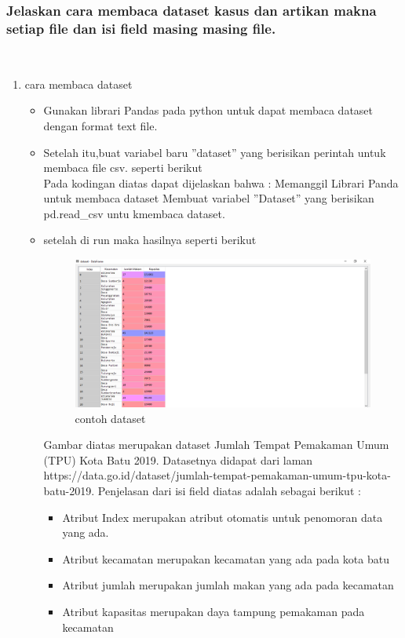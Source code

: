 \subsubsection{Jelaskan cara membaca dataset kasus dan artikan makna setiap ﬁle dan isi ﬁeld masing masing ﬁle.}
\hfill\\
\begin{enumerate}
\item cara membaca dataset
\hfill\\
	\begin{itemize}
	\item Gunakan librari Pandas pada python untuk dapat membaca dataset dengan format text ﬁle.
	\item Setelah itu,buat variabel baru ”dataset” yang berisikan perintah untuk membaca ﬁle csv. seperti berikut
	\hfill\\
	
	Pada kodingan diatas dapat dijelaskan bahwa : Memanggil Librari Panda untuk membaca dataset Membuat variabel ”Dataset” yang berisikan pd.read\_csv untu kmembaca dataset.
	
	\item setelah di run maka hasilnya seperti berikut
	\hfill\\
\begin{figure}[H]
	\centering
	\includegraphics[width=12cm]{figures/1174087/3/2.png}
	\caption{contoh dataset}
\end{figure}
	
	Gambar diatas merupakan dataset Jumlah Tempat Pemakaman Umum (TPU) Kota Batu 2019. Datasetnya didapat dari laman https://data.go.id/dataset/jumlah-tempat-pemakaman-umum-tpu-kota-batu-2019. Penjelasan dari isi ﬁeld diatas adalah sebagai berikut :
	\begin{itemize}
	\item Atribut Index merupakan atribut otomatis untuk penomoran data yang ada. 
	\item Atribut kecamatan merupakan kecamatan yang ada pada kota batu
	\item Atribut jumlah merupakan jumlah makan yang ada pada kecamatan
	\item Atribut kapasitas merupakan daya tampung pemakaman pada kecamatan
	\end{itemize}
	\end{itemize}
\end{enumerate}

